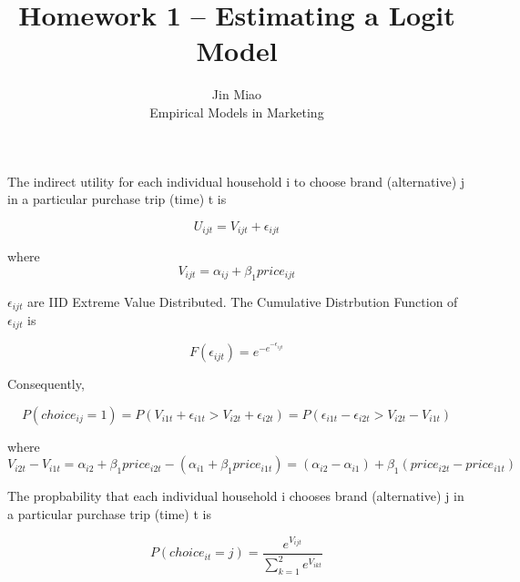 \documentclass[12pt]{article}
\newenvironment{Question}[2][Question]{\begin{trivlist}
\item[\hskip \labelsep {\bfseries #1}\hskip \labelsep {\bfseries #2.}]}{\end{trivlist}}
\begin{document}
 
 
\title{Homework 1 -- Estimating a Logit Model}
\author{Jin Miao\\ 
Empirical Models in Marketing} 
 
\maketitle
 
\begin{Question}{1} 
The indirect utility for each individual household i to choose brand (alternative) j in a particular purchase trip (time) t is

\begin{equation*}
U_{ijt} = V_{ijt} + \epsilon_{ijt}
\end{equation*}

where 
\begin{equation*}
V_{ijt} = \alpha_{ij} + \beta_{1} price_{ijt}
\end{equation*}

$\epsilon_{ijt}$ are IID Extreme Value Distributed. The Cumulative Distrbution Function of $\epsilon_{ijt}$ is  

\begin{equation*}
F(\epsilon_{ijt}) = e^{-e^{-\epsilon_{ijt}}}
\end{equation*}

Consequently, 

\begin{equation*}
P(choice_{ij} = 1) = P(V_{i1t} + \epsilon_{i1t} > V_{i2t} + \epsilon_{i2t}) = P(\epsilon_{i1t} - \epsilon_{i2t} > V_{i2t} - V_{i1t})
\end{equation*} 

where 
\begin{equation*}
V_{i2t} - V_{i1t} = \alpha_{i2} + \beta_{1} price_{i2t} - (\alpha_{i1} + \beta_{1} price_{i1t}) = (\alpha_{i2} - \alpha_{i1}) + \beta_{1} (price_{i2t} - price_{i1t})
\end{equation*}

The propbability that each individual household i chooses brand (alternative) j in a particular purchase trip (time) t is 

\begin{equation*}
P(choice_{it} = j) = \frac{e^{ V_{ijt} }}{\sum_{k = 1}^{2}e^{ V_{ikt} }}
\end{equation*}
 

\end{Question}
\end{document}
